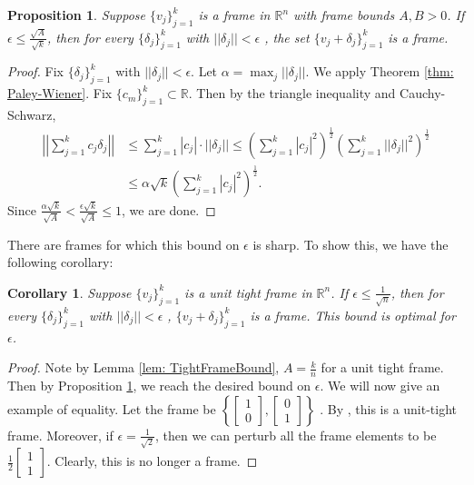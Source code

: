 \documentclass[11pt, reqno]{amsart}
\providecommand{\R}{\mathbb R}
\newtheorem{prop}[theorem]{Proposition}
\newtheorem{corollary}{Corollary}[theorem]
\numberwithin{equation}{section}
\begin{document}
 
\begin{prop}\label{thm: StabilitywithPW}
    Suppose $\{v_j\}_{j=1}^k$ is a frame in $\R^n$ with frame bounds $A, B>0$. If $\epsilon\le \frac{\sqrt{A}}{\sqrt{k}}$, then for every $\{\delta_j\}_{j=1}^k$ with $||\delta_j||< \epsilon$ ,  the set $\{v_j+\delta_j\}_{j=1}^k$ is a frame.
\end{prop}

\begin{proof}

Fix $\{\delta_j\}_{j=1}^k$ with $||\delta_j||< \epsilon$. Let $\alpha = \max_{j}||\delta_j||$. We apply Theorem \ref{thm: Paley-Wiener}. Fix $\{c_m\}_{j=1}^k\subset \R$. Then by the triangle inequality and Cauchy-Schwarz, \begin{align*}
    \left|\left|\sum_{j=1}^k c_j\delta_{j}\right|\right| &\le \sum_{j=1}^k |c_j|\cdot ||\delta_j||\le \left(\sum_{j=1}^k |c_j|^{2}\right)^{\frac{1}{2}}\left(\sum_{j=1}^k ||\delta_j||^2\right)^{\frac{1}{2}}\\
    &\le\alpha\sqrt{k}\left(\sum_{j=1}^k |c_j|^{2}\right)^{\frac{1}{2}}.
\end{align*}
Since $\frac{\alpha\sqrt{k}}{\sqrt{A}}< \frac{\epsilon\sqrt{k}}{\sqrt{A}}\le 1$, we are done.
\end{proof}

There are frames for which this bound on $\epsilon$ is sharp. To show this, we have the following corollary:

\begin{corollary}\label{cor: UTFstability}
    Suppose $\{v_j\}_{j=1}^k$ is a unit tight frame in $\R^n$. If $\epsilon\le  \frac{1}{\sqrt{n}}$, then for every $\{\delta_j\}_{j=1}^k$ with $||\delta_j||< \epsilon$ , $\{v_j+\delta_j\}_{j=1}^k$ is a frame. This bound is optimal for $\epsilon$.
\end{corollary}

\begin{proof}
    Note by Lemma \ref{lem: TightFrameBound}, $A=\frac{k}{n}$ for a unit tight frame. Then by Proposition \ref{thm: StabilitywithPW}, we reach the desired bound on $\epsilon.$
    We will now give an example of equality. Let the frame be $\left\{\begin{bmatrix}
    1\\ 0
\end{bmatrix},\begin{bmatrix}
    0\\ 1
\end{bmatrix}\right\}$ . By \cite[Lemma 4.1]{Han}, this is a unit-tight frame. Moreover, if $\epsilon=\frac{1}{\sqrt{2}}$, then we can perturb all the frame elements to be $\frac{1}{2}\begin{bmatrix}
    1\\ 1
\end{bmatrix}.$ Clearly, this is no longer a frame.

\end{proof}
\end{document}
